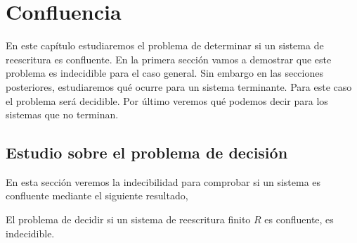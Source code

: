 \chapter{Confluencia}

En este capítulo estudiaremos el problema de determinar si un sistema
de reescritura es confluente. En la primera sección vamos a demostrar
que este problema es indecidible para el caso general. Sin embargo en
las secciones posteriores, estudiaremos qué ocurre para un sistema
terminante. Para este caso el problema será decidible. Por último
veremos qué podemos decir para los sistemas que no terminan.

\section{Estudio sobre el problema de decisión}
  
En esta sección veremos la indecibilidad para comprobar si un sistema
es confluente mediante el siguiente resultado,

\begin{teor}
  El problema de decidir si un sistema de reescritura finito $R$ es
  confluente, es indecidible.
\end{teor}

